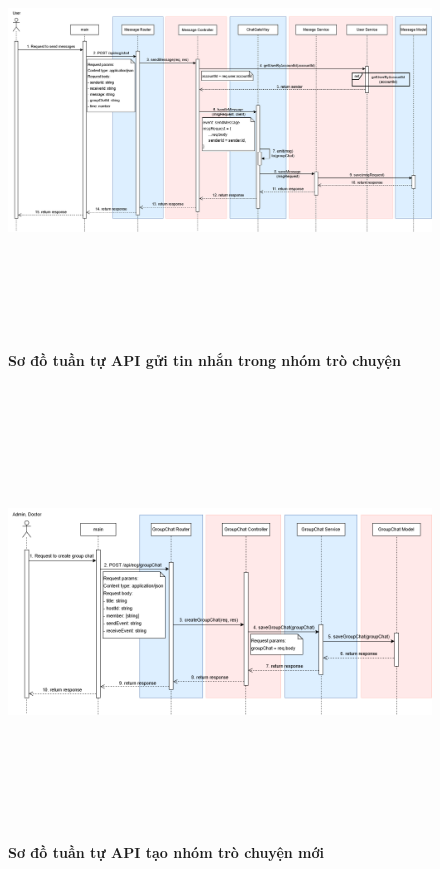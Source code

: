 \begin{figure}[H]
	\centering
	\includegraphics[width=15cm,height=12cm]{Images/api_sequence/chat/sendMessage.drawio.png}
	\caption[Sơ đồ tuần tự API gửi tin nhắn trong nhóm trò chuyện]{\bfseries \fontsize{12pt}{0pt}\selectfont Sơ đồ tuần tự API gửi tin nhắn trong nhóm trò chuyện}
	\label{sequence_diagram_send_chat}
\end{figure}

\begin{figure}[H]
	\centering
	\includegraphics[width=15cm,height=12cm]{Images/api_sequence/chat/createGroupChat.drawio.png}
	\caption[Sơ đồ tuần tự API tạo nhóm trò chuyện mới]{\bfseries \fontsize{12pt}{0pt}\selectfont Sơ đồ tuần tự API tạo nhóm trò chuyện mới}
	\label{sequence_diagram_create_group_chat}
\end{figure}

